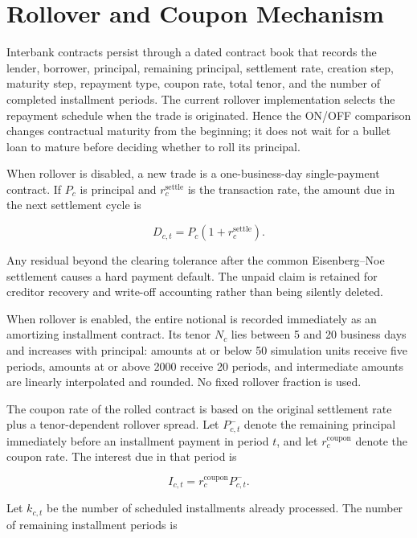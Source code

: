 \section{Rollover and Coupon Mechanism}

Interbank contracts persist through a dated contract book that records
the lender, borrower, principal, remaining principal, settlement rate,
creation step, maturity step, repayment type, coupon rate, total tenor,
and the number of completed installment periods. The current rollover
implementation selects the repayment schedule when the trade is
originated. Hence the ON/OFF comparison changes contractual maturity
from the beginning; it does not wait for a bullet loan to mature before
deciding whether to roll its principal.

When rollover is disabled, a new trade is a one-business-day
single-payment contract. If \(P_c\) is principal and
\(r_c^{\mathrm{settle}}\) is the transaction rate, the amount due in the
next settlement cycle is

\begin{equation}
D_{c,t}=P_c\left(1+r_c^{\mathrm{settle}}\right).
\label{eq:single-payment-due}
\end{equation}

Any residual beyond the clearing tolerance after the common
Eisenberg--Noe settlement causes a hard payment default. The unpaid claim
is retained for creditor recovery and write-off accounting rather than
being silently deleted.

When rollover is enabled, the entire notional is recorded immediately as
an amortizing installment contract. Its tenor \(N_c\) lies between 5 and
20 business days and increases with principal: amounts at or below 50
simulation units receive five periods, amounts at or above 2000 receive
20 periods, and intermediate amounts are linearly interpolated and
rounded. No fixed rollover fraction is used.

The coupon rate of the rolled contract is based on the original
settlement rate plus a tenor-dependent rollover spread. Let
\(P_{c,t}^{-}\) denote the remaining principal immediately before an
installment payment in period \(t\), and let
\(r_c^{\mathrm{coupon}}\) denote the coupon rate. The interest due in
that period is

\begin{equation}
I_{c,t}
=
r_c^{\mathrm{coupon}}P_{c,t}^{-}.
\label{eq:coupon_payment}
\end{equation}

Let \(k_{c,t}\) be the number of scheduled installments already processed. The
number of remaining installment periods is

